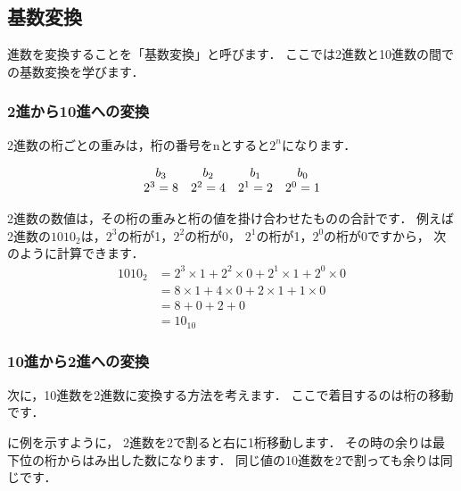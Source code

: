 \subsection{基数変換}
進数を変換することを「基数変換」と呼びます．
ここでは2進数と10進数の間での基数変換を学びます．


\subsubsection{2進から10進への変換}

2進数の桁ごとの重みは，桁の番号をnとすると$2^n$になります．

{\small\[
\begin{array}{c c c c c }
b_3     & b_2     & b_1     & b_0     \\
2^3 = 8 & 2^2 = 4 & 2^1 = 2 & 2^0 = 1 \\
\end{array}
\]}

2進数の数値は，その桁の重みと桁の値を掛け合わせたものの合計です．
例えば2進数の$1010_2$は，$2^3$の桁が1，$2^2$の桁が0，
$2^1$の桁が1，$2^0$の桁が0ですから，
次のように計算できます．
{\small\begin{align*}
1010_2 &= 2^3 \times 1 + 2^2 \times 0 + 2^1 \times 1 + 2^0 \times 0 \\
       &= 8 \times 1 + 4 \times 0 + 2 \times 1 + 1 \times 0 \\
       &= 8 + 0 + 2 + 0 \\
       &= 10_{10}
\end{align*}}

\subsubsection{10進から2進への変換}

次に，10進数を2進数に変換する方法を考えます．
ここで着目するのは桁の移動です．

に例を示すように，
2進数を2で割ると右に1桁移動します．
その時の余りは最下位の桁からはみ出した数になります．
同じ値の10進数を2で割っても余りは同じです．

